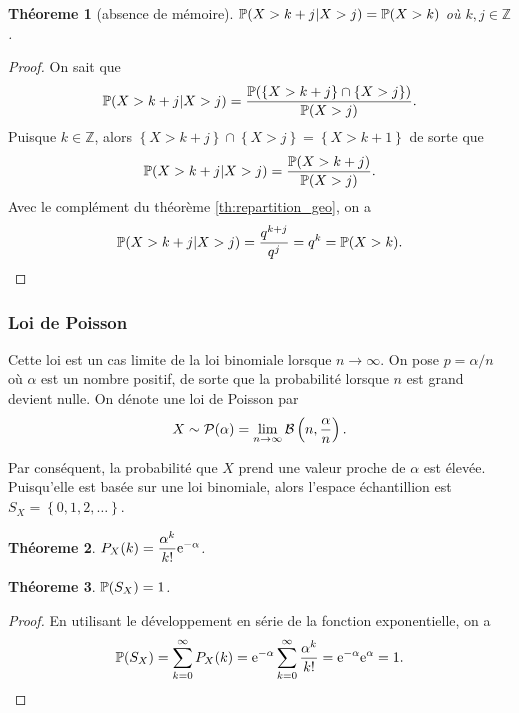 \documentclass[11pt]{article}
\renewcommand\P{%
	\ensuremath{%
		\mathbb{P}%
	}%
}%
\newcommand\e{%
	\ensuremath{%
		\mathrm{e}%
	}%
}%
\newcommand\bin{%
	\ensuremath{%
		\mathcal{B}%
	}%
}%
\newcommand\poi{%
	\ensuremath{%
		\mathcal{P}%
	}%
}%
\newtheorem{theoreme}{Théoreme}[section]
\begin{document}
\begin{theoreme}[absence de mémoire]
	$\P(X>k+j|X>j)=\P(X>k)$ où $k,j\in\mathbb{Z}$.
\end{theoreme}

\begin{proof}
	On sait que
	\begin{equation*}
		\P(X>k+j|X>j)=\frac{\P(
			\left\{X>k+j\right\}\cap
	   		\left\{X>j\right\})}{\P(X>j)}.
	\end{equation*}
	Puisque $k\in\mathbb{Z}$, alors $\left\{X>k+j\right\}\cap\left\{X>j\right\}
	=\left\{X>k+1\right\}$ de sorte que
	\begin{equation*}
		\P(X>k+j|X>j)=\frac{\P(X>k+j)}{\P(X>j)}.
	\end{equation*}
	Avec le complément du théorème \ref{th:repartition_geo}, on a
	\begin{equation*}
		\P(X>k+j|X>j)=\frac{q^{k+j}}{q^{j}}=q^{k}=\P(X>k).
	\end{equation*}
\end{proof}

\subsubsection{Loi de Poisson}
Cette loi est un cas limite de la loi binomiale lorsque $n\rightarrow\infty$.
On pose $p=\alpha/n$ où $\alpha$ est un nombre positif, de sorte que la 
probabilité lorsque $n$ est grand devient nulle. On dénote une loi de Poisson
par
\begin{equation*}
	X\sim\poi(\alpha)
	=\lim_{n\rightarrow\infty}\bin\left(n,\frac{\alpha}{n}\right).
\end{equation*}

Par conséquent, la probabilité que $X$ prend une valeur proche de $\alpha$ est
élevée. Puisqu'elle est basée sur une loi binomiale, alors l'espace
échantillion est $S_X=\left\{0,1,2,\dots\right\}$.

\begin{theoreme}
	$P_X(k)=\dfrac{\alpha^k}{k!}\e^{-\alpha}$.
\end{theoreme}

\begin{theoreme}
	$\P(S_X)=1$.
\end{theoreme}

\begin{proof}
	En utilisant le développement en série de la fonction exponentielle, on a
	\begin{equation*}
		\P(S_X)
		=\sum_{k=0}^\infty P_X(k)
		=\e^{-\alpha}\sum_{k=0}^\infty\frac{\alpha^k}{k!}
		=\e^{-\alpha}\e^\alpha
		=1.
	\end{equation*}
\end{proof}
\end{document}
